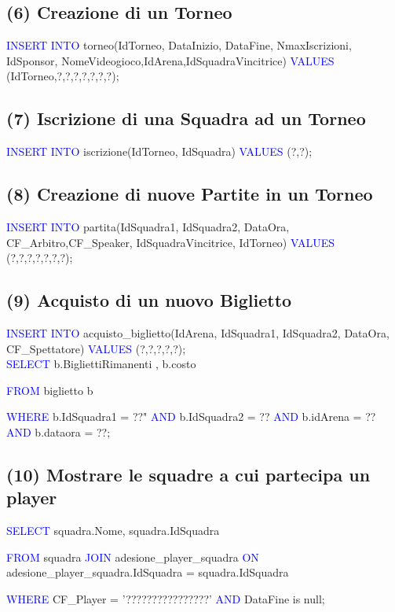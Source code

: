 \documentclass[a4paper,12pt]{report}
\begin{document}
\subsection*{(6) Creazione di un Torneo}
\textcolor{blue}{INSERT INTO} torneo(IdTorneo, DataInizio, DataFine, NmaxIscrizioni, IdSponsor, NomeVideogioco,IdArena,IdSquadraVincitrice)
\textcolor{blue}{VALUES} (IdTorneo,?,?,?,?,?,?,?);

\subsection*{(7) Iscrizione di una Squadra ad un Torneo}
\textcolor{blue}{INSERT INTO} iscrizione(IdTorneo, IdSquadra)
\textcolor{blue}{VALUES} (?,?);


\subsection*{(8) Creazione di nuove Partite in un Torneo}
\textcolor{blue}{INSERT INTO} partita(IdSquadra1, IdSquadra2, DataOra, CF\_Arbitro,CF\_Speaker, IdSquadraVincitrice, IdTorneo)
\textcolor{blue}{VALUES} (?,?,?,?,?,?,?);

\subsection*{(9) Acquisto di un nuovo Biglietto}
\textcolor{blue}{INSERT INTO} acquisto\_biglietto(IdArena, IdSquadra1, IdSquadra2, DataOra, CF\_Spettatore)
\textcolor{blue}{VALUES} (?,?,?,?,?);\\

\noindent\textcolor{blue}{SELECT} b.BigliettiRimanenti , b.costo

\noindent \textcolor{blue}{FROM} biglietto b 

\noindent \textcolor{blue}{WHERE} b.IdSquadra1 = ??" \textcolor{blue}{AND} b.IdSquadra2 = ?? \textcolor{blue}{AND} b.idArena = ?? \textcolor{blue}{AND} b.dataora = ??;


\subsection*{(10) Mostrare le squadre a cui partecipa un player}
\textcolor{blue}{SELECT} squadra.Nome, squadra.IdSquadra 

\noindent \textcolor{blue}{FROM} squadra \textcolor{blue}{JOIN} adesione\_player\_squadra \textcolor{blue}{ON} adesione\_player\_squadra.IdSquadra = squadra.IdSquadra 

\noindent \textcolor{blue}{WHERE} CF\_Player = '????????????????' \textcolor{blue}{AND} DataFine is null;
\end{document}

